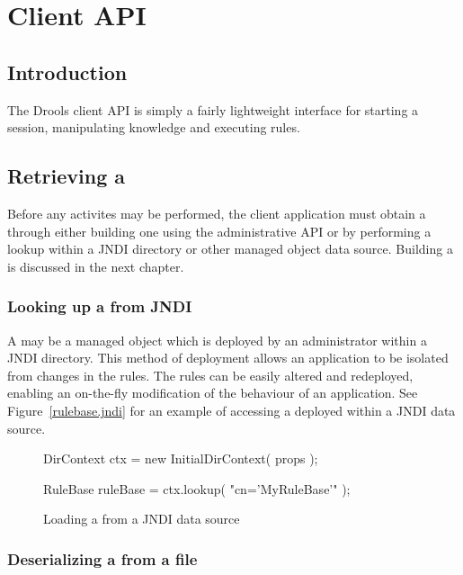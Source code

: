 \chapter{Client API}
\label{client.api}

\section{Introduction}

The Drools client API is simply a fairly lightweight interface for
starting a session, manipulating knowledge and executing rules.

\section{Retrieving a }

Before any activites may be performed, the client application must
obtain a  through either building one using
the administrative API or by performing a lookup within a JNDI
directory or other managed object data source.  Building
a  is discussed in the next chapter.

\subsection{Looking up a  from JNDI}

A  may be a managed object which is deployed
by an administrator within a JNDI directory. This method of deployment
allows an application to be isolated from changes in the rules.  The
rules can be easily altered and redeployed, enabling an on-the-fly
modification of the behaviour of an application.  See
Figure~\vref{rulebase.jndi} for an example of accessing a
 deployed within a JNDI data source.

\begin{figure}
\begin{javaCodelisting}
DirContext ctx = new InitialDirContext( props );

RuleBase ruleBase = ctx.lookup( "cn='MyRuleBase'" );
\end{javaCodelisting}
\caption{Loading a  from a JNDI data source}
\label{rulebase.jndi}
\end{figure}

\subsection{Deserializing a  from a file}

